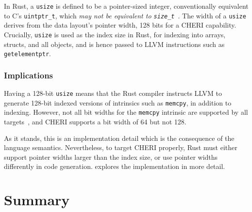 \documentclass[dissertation.tex]{subfiles}
\begin{document}
In Rust, a \texttt{usize} is defined to be a pointer-sized integer,
conventionally equivalent to C's \texttt{uintptr\_t}, which \emph{may
not be equivalent to \texttt{size\_t}}~\cite{rust-rfc-isize}.
The width of a \texttt{usize} derives from the data layout's pointer
width, 128 bits for a CHERI capability.
Crucially, \texttt{usize} is used as the index size in Rust, for
indexing into arrays, structs, and all objects, and is hence passed to
LLVM instructions such as \texttt{getelementptr}.

\subsubsection{Implications}
Having a 128-bit \texttt{usize} means that the Rust compiler instructs
LLVM to generate 128-bit indexed versions of intrinsics such as
\texttt{memcpy}, in addition to indexing.
However, not all bit widths for the \texttt{memcpy} intrinsic are
supported by all targets~\cite{llvm-langref}, and CHERI supports a bit
width of 64 but not 128.

As it stands, this is an implementation detail which is the consequence
of the language semantics.
Nevertheless, to target CHERI properly, Rust must either support pointer
widths larger than the index size, or use pointer widths differently in
code generation.
 explores the implementation in more detail.


\section{Summary}
\end{document}
